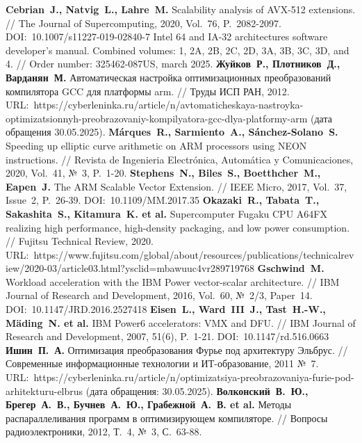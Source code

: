 \begin{thebibliography}{99}

\textbf{Cebrian~J., Natvig~L., Lahre~M.} Scalability analysis of AVX-512 extensions. // The Journal of Supercomputing, 2020, Vol.~76, P.~2082-2097. DOI:~10.1007/s11227-019-02840-7
Intel 64 and IA-32 architectures software developer's manual. Combined volumes: 1, 2A, 2B, 2C, 2D, 3A, 3B, 3C, 3D, and 4. // Order number: 325462-087US, march 2025.
\textbf{Жуйков~Р., Плотников~Д., Варданян~М.} Автоматическая настройка оптимизационных преобразований компилятора GCC для платформы arm. // Труды ИСП РАН, 2012. URL:~https://cyberleninka.ru/article/n/avtomaticheskaya-nastroyka-optimizatsionnyh-preobrazovaniy-kompilyatora-gcc-dlya-platformy-arm (дата обращения 30.05.2025).
\textbf{M{\'a}rques~R., Sarmiento~A., S{\'a}nchez-Solano~S.} Speeding up elliptic curve arithmetic on ARM processors using NEON instructions. // Revista de Ingenieria Electr{\'o}nica, Autom{\'a}tica y Comunicaciones, 2020, Vol.~41, №~3, P.~1-20.
\textbf{Stephens~N., Biles~S., Boetthcher~M., Eapen~J.} The ARM Scalable Vector Extension. // IEEE Micro, 2017, Vol.~37, Issue~2, P.~26-39. DOI:~10.1109/MM.2017.35
\textbf{Okazaki~R., Tabata~T., Sakashita~S., Kitamura~K. et al.} Supercomputer Fugaku CPU A64FX realizing high performance, high-density packaging, and low power consumption. // Fujitsu Technical Review, 2020. URL:~https://www.fujitsu.com/global/about/resources/publications/technicalreview/2020-03/article03.html?ysclid=mbawuuc4vr289719768
\textbf{Gschwind~M.} Workload acceleration with the IBM Power vector-scalar architecture. // IBM Journal of Research and Development, 2016, Vol.~60, №~2/3, Paper~14. DOI:~10.1147/JRD.2016.2527418
\textbf{Eisen~L., Ward~III~J., Tast~H.-W., M{\"a}ding~N. et al.} IBM Power6 accelerators: VMX and DFU. // IBM Journal of Research and Development, 2007, 51(6), P.~1-21. DOI:~10.1147/rd.516.0663
\textbf{Ишин~П.~А.} Оптимизация преобразования Фурье под архитектуру Эльбрус. // Современные информационные технологии и ИТ-образование, 2011 №~7. URL:~https://cyberleninka.ru/article/n/optimizatsiya-preobrazovaniya-furie-pod-arhitekturu-elbrus (дата обращения: 30.05.2025).
\textbf{Волконский~В.~Ю., Брегер~А.~В., Бучнев~А.~Ю., Грабежной~А.~В. et al.} Методы распараллеливания программ в оптимизирующем компиляторе. // Вопросы радиоэлектроники, 2012, Т.~4, №~3, С.~63-88.

\end{thebibliography}
